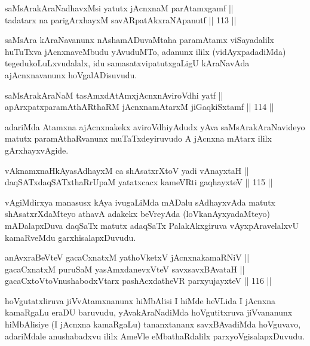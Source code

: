 \begin{shl}
saMsArakAraNadhavxMsi yatutx jAcnxnaM parAtamxgamf ||  \\
tadatarx na parigArxhayxM savARpatAkxraNApanutf \hfill || 113 ||  
\end{shl}

\begin{artha}
saMsAra kAraNavanunx nAshamADuvaMtaha paramAtamx viSayadalilx huTuTxva
jAcnxnaveMbudu yAvuduMTo, adanunx ililx (vidAyxpadadiMda)
tegedukoLuLxvudalalx, idu samasatxvipatutxgaLigU kAraNavAda
ajAcnxnavanunx hoVgalADisuvudu.
\end{artha}

\begin{shl}
saMsArakAraNaM tasAmxdAtAmxjAcnxnAviroVdhi yatf || \\
apArxpatxparamAthARthaRM jAcnxnamAtarxM jiGaqkiSxtamf \hfill || 114 ||  
\end{shl}

\begin{artha}
adariMda Atamxna ajAcnxnakekx aviroVdhiyAdudx yAva
saMsArakAraNavideyo matutx paramAthaRvanunx muTaTxdeyiruvudo A jAcnxna
mAtarx ililx gArxhayxvAgide.
\end{artha}

\begin{shl}
vAknamxnaHkAyasAdhayxM ca shAsatxrXtoV yadi vA\s nayxtaH || \\
daqSATxdaqSATxthaRrUpaM yatatxcacx kameVRti gaqhayxteV \hfill || 115 ||  
\end{shl}

\begin{artha}
vAgiMdirxya manasusx kAya ivugaLiMda mADalu sAdhayxvAda matutx
shAsatxrXdaMteyo athavA adakekx beVreyAda (loVkanAyxyadaMteyo)
mADalapxDuva daqSaTx matutx adaqSaTx PalakAkxgiruva vAyxpAravelalxvU
kamaRveMdu garxhisalapxDuvudu.
\end{artha}

\begin{shl}
anAvxraBeVteV gacaCxnatxM yathoVketxV jAcnxnakamaRNiV || \\
gacaCxnatxM puruSaM yasAmxdanevxVteV savxsavxBAvataH || \\
gacaCxtoV\s toV\s nushabodxV\s tarx pashAcxdatheVR parxyujayxteV \hfill || 116 ||  
\end{shl}

\begin{artha}
hoVgutatxliruva jiVvAtamxnanunx hiMbAlisi I hiMde heVLida I jAcnxna
kamaRgaLu eraDU baruvudu, yAvakAraNadiMda hoVgutitxruva jiVvananunx
hiMbAlisiye (I jAcnxna kamaRgaLu) tananxtananx savxBAvadiMda
hoVguvavo, adariMdale anushabadxvu ililx AmeVle eMbathaRdalilx
parxyoVgisalapxDuvudu.
\end{artha}

